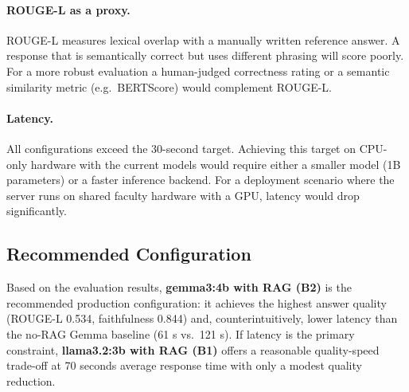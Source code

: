 \paragraph{ROUGE-L as a proxy.} ROUGE-L measures lexical overlap with a manually written reference answer. A response that is semantically correct but uses different phrasing will score poorly. For a more robust evaluation a human-judged correctness rating or a semantic similarity metric (e.g.\ BERTScore) would complement ROUGE-L.

\paragraph{Latency.} All configurations exceed the 30-second target. Achieving this target on CPU-only hardware with the current models would require either a smaller model (1B parameters) or a faster inference backend. For a deployment scenario where the server runs on shared faculty hardware with a GPU, latency would drop significantly.

\subsection{Recommended Configuration}

Based on the evaluation results, \textbf{gemma3:4b with RAG (B2)} is the recommended production configuration: it achieves the highest answer quality (ROUGE-L 0.534, faithfulness 0.844) and, counterintuitively, lower latency than the no-RAG Gemma baseline (61 s vs.\ 121 s). If latency is the primary constraint, \textbf{llama3.2:3b with RAG (B1)} offers a reasonable quality-speed trade-off at 70 seconds average response time with only a modest quality reduction.
